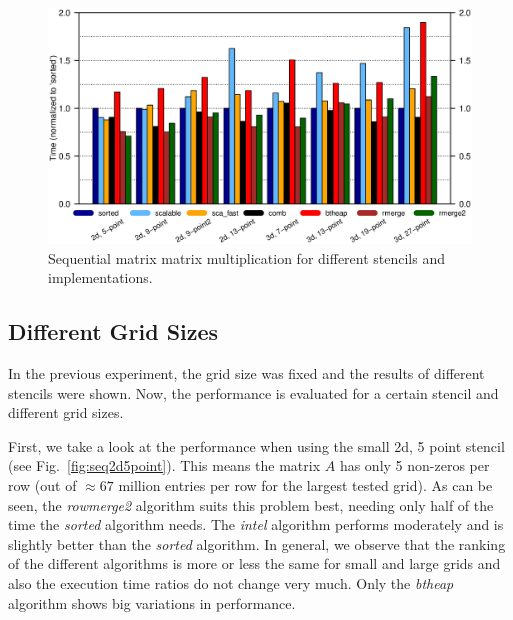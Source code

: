 

\begin{figure}[tb]
	\centering
	\hspace*{-10mm}\includegraphics[width=1.1\textwidth, trim={0 7.cm 0 1.6cm},clip]{petsc-matmatmult}
	\caption{Sequential matrix matrix multiplication for different stencils and implementations.  } 
	\label{fig:ex209_R}
\end{figure}

\subsection{Different Grid Sizes}

In the previous experiment, the grid size was fixed and the results of different stencils were shown. Now, the performance is evaluated for a certain stencil and different grid sizes. 

First, we take a look at the performance when using the small 2d, 5 point stencil (see Fig.~\ref{fig:seq2d5point}). This means the matrix $A$ has only 5 non-zeros per row (out of $\approx 67$ million entries per row for the largest tested grid). As can be seen, the \textit{rowmerge2} algorithm suits this problem best, needing only half of the time the \textit{sorted} algorithm needs. The \textit{intel} algorithm performs moderately and is slightly better than the \textit{sorted} algorithm. In general, we observe that the ranking of the different algorithms is more or less the same for small and large grids and also the execution time ratios do not change very much. Only the \textit{btheap} algorithm shows big variations in performance.

